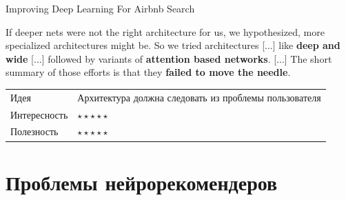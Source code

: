 \documentclass[11pt,aspectratio=169,handout]{beamer}
\begin{document}
\begin{frame}{Improving Deep Learning For Airbnb Search \cite{AIRBNB2}}

\begin{tcolorbox}[colback=warn!5,colframe=warn!80,title=]
If deeper nets were not the right architecture for us, we hypothesized, more specialized architectures might be. 
So we tried architectures [...] like {\bf deep and wide} [...] followed by variants of {\bf attention based networks}. 
[...] The short summary of those efforts is that they {\bf failed to move the needle}.
\end{tcolorbox}

\vfill
\begin{small}
\begin{tabular}{l l}
Идея & Архитектура должна следовать из проблемы пользователя \\
Интересность & $\star\star\star\star\star$ \\
Полезность & $\star\star\star\star\star$
\end{tabular}
\end{small}

\end{frame}

\section{Проблемы нейрорекомендеров}
\end{document}
